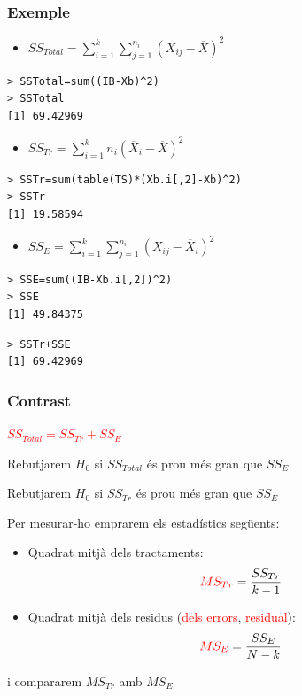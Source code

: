\documentclass[12pt,t]{beamer}
\newcommand{\red}[1]{\textcolor{red}{#1}}
\renewcommand{\emph}[1]{{\color{red}#1}}
\theoremstyle{plain}
\theoremstyle{definition}
\begin{document}
\begin{frame}[fragile]
\frametitle{Exemple}\vspace*{-3ex}


\begin{itemize}
\item $SS_{Total}=\sum\limits_{i=1}^k\sum\limits_{j=1}^{n_i} (X_{ij}-\overline{X})^2$
\end{itemize}

\begin{lstlisting}
> SSTotal=sum((IB-Xb)^2)
> SSTotal
[1] 69.42969
\end{lstlisting}

\begin{itemize}
\item $SS_{Tr}=\sum\limits_{i=1}^k n_i
(\overline{X}_{i}-\overline{X})^2$
\end{itemize}

\begin{lstlisting}
> SSTr=sum(table(TS)*(Xb.i[,2]-Xb)^2)
> SSTr
[1] 19.58594
\end{lstlisting}

\begin{itemize}
\item  $SS_E=\sum\limits_{i=1}^k\sum\limits_{j=1}^{n_i} (X_{ij}-\overline{X}_{i})^2$
\end{itemize}

\begin{lstlisting}
> SSE=sum((IB-Xb.i[,2])^2)
> SSE
[1] 49.84375
\end{lstlisting}\pause

\begin{lstlisting}
> SSTr+SSE
[1] 69.42969\end{lstlisting}
\end{frame}

\begin{frame}
\frametitle{Contrast}

\red{$SS_{Total}=SS_{Tr}+SS_E$}\medskip

Rebutjarem $H_0$ si $SS_{Total}$ és prou més gran que $SS_E$\pause\medskip

Rebutjarem $H_0$ si $SS_{Tr}$ és prou més gran que $SS_E$\pause\medskip

Per mesurar-ho emprarem els estadístics següents:\medskip

\begin{itemize}
\item \emph{Quadrat mitjà dels tractaments}:
$$
\red{MS_{Tr}}=\frac{SS_{Tr}}{k-1}
$$
\item \emph{Quadrat mitjà dels residus} (\red{dels errors}, \red{residual}):
$$
\red{MS_E}=\frac{SS_E}{N-k}
$$
\end{itemize}
i compararem $MS_{Tr}$ amb $MS_E$
\end{frame}
\end{document}
